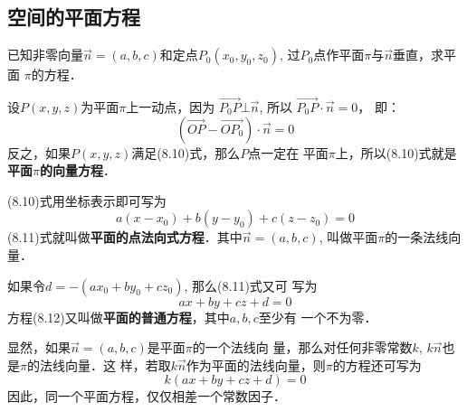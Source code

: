 \subsection{空间的平面方程}

已知非零向量$\vec{n}=(a,b,c)$和定点$P_0(x_0,y_0,z_0)$,
过$P_0$点作平面$\pi$与$\vec{n}$垂直，求平面
$\pi$的方程．

\begin{figure}[htp]
    \centering
{}
    \caption{}
\end{figure}

设$P(x,y,z)$为平面$\pi$上一动点，因为
$\Vec{P_0P}\bot\vec{n}$, 所以
$\Vec{P_0P}\cdot \vec{n}=0$，
即：
\begin{equation}
    \left(\Vec{OP}-\Vec{OP_0}\right)\cdot\vec{n}=0
\end{equation}
反之，如果$P(x,y,z)$满足(8.10)式，那么$P$点一定在
平面$\pi$上，所以(8.10)式就是\textbf{平面$\pi$的向量方程}．

(8.10)式用坐标表示即可写为
\begin{equation}
    a(x-x_0)+b(y-y_0)+c(z-z_0)=0
\end{equation}
(8.11)式就叫做\textbf{平面的点法向式方程}．其中$\vec{n}=(a,b,c)$, 
叫做平面$\pi$的一条法线向量．

如果令$d=-(ax_0+by_0+cz_0)$, 那么(8.11)式又可
写为
\begin{equation}
    ax+by+cz+d=0
\end{equation}
方程(8.12)又叫做\textbf{平面的普通方程}，其中$a,b,c$至少有
一个不为零．

显然，如果$\vec{n}=(a,b,c)$是平面$\pi$的一个法线向
量，那么对任何非零常数$k$, $k\vec{n}$也是$\pi$的法线向量．这
样，若取$k\vec{n}$作为平面的法线向量，则$\pi$的方程还可写为
\[k(ax+by+cz+d)=0\]
因此，同一个平面方程，仅仅相差一个常数因子．

